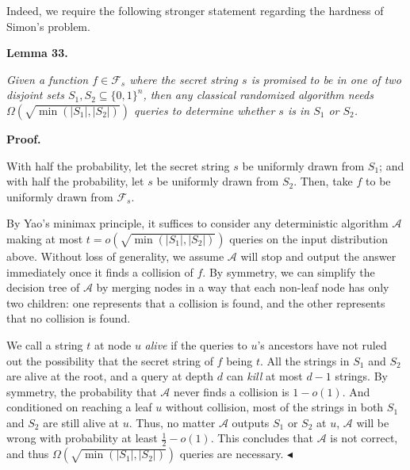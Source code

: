 \documentclass[10pt,a4paper]{article}
\begin{document}



Indeed, we require the following stronger statement regarding the hardness of Simon’s problem.\par





\par\medskip\noindent\textbf{
\textbf{Lemma 33}\textbf{.}
}\par



\emph{Given a function $f\in\mathcal{F}_{s}$
where the secret string $s$ is promised to be in one of two disjoint sets $S_{1},S_{2}\subseteq\{0,1\}^{n}$, then any classical randomized algorithm needs $\Omega(\sqrt{\min(|S_{1}|,|S_{2}|)})$ queries to determine whether $s$ is in $S_{1}$ or $S_{2}$.}\par






\par\medskip\noindent\textbf{Proof.}\par




With half the probability, let the secret string $s$ be uniformly drawn from $S_{1}$; and with half the probability, let $s$ be uniformly drawn from $S_{2}$. Then, take $f$ to be uniformly drawn from $\mathcal{F}_{s}$.\par




By Yao’s minimax principle, it suffices to consider any deterministic algorithm $\mathcal{A}$ making at most $t=o(\sqrt{\min(|S_{1}|,|S_{2}|)})$ queries on the input distribution above. Without loss of generality, we assume $\mathcal{A}$ will stop and output the answer immediately once it finds a collision of $f$.
By symmetry, we can simplify the decision tree of $\mathcal{A}$ by merging nodes in a way that each non-leaf node has only two children: one represents that a collision is found, and the other represents that no collision is found.\par




We call a string $t$ at node $u$ \emph{alive} if the queries to $u$’s ancestors have not ruled out the possibility that the secret string of $f$ being $t$. All the strings in $S_{1}$ and $S_{2}$ are alive at the root, and a query at depth $d$ can \emph{kill} at most $d-1$ strings. By symmetry, the probability that $\mathcal{A}$ never finds a collision is $1-o(1)$. And conditioned on reaching a leaf $u$ without collision, most of the strings in both $S_{1}$ and $S_{2}$ are still alive at $u$. Thus, no matter $\mathcal{A}$ outputs $S_{1}$ or $S_{2}$ at $u$, $\mathcal{A}$ will be wrong with probability at least $\frac{1}{2}-o(1)$. This concludes that $\mathcal{A}$ is not correct, and thus $\Omega(\sqrt{\min(|S_{1}|,|S_{2}|)})$ queries are necessary.
$\blacktriangleleft$\par
\end{document}
